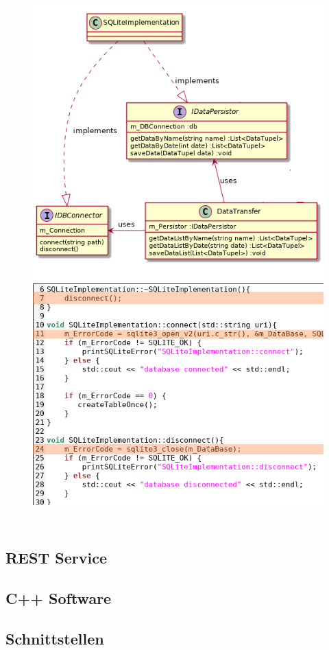 \begin{frame}
\begin{columns}[c]
\begin{figure}
\begin{overprint}
                \includegraphics[width=.8\textwidth]{cppfeature_isp.png}
                \includegraphics[width=\textwidth]{raii.png}
            \end{overprint}
        \end{figure}
       
    \end{columns}
\end{frame}

\subsection{REST Service}
\begin{frame}

\end{frame}

\subsection{C++ Software}
\begin{frame}

\end{frame}

\subsection{Schnittstellen}
\begin{frame}

\end{frame}